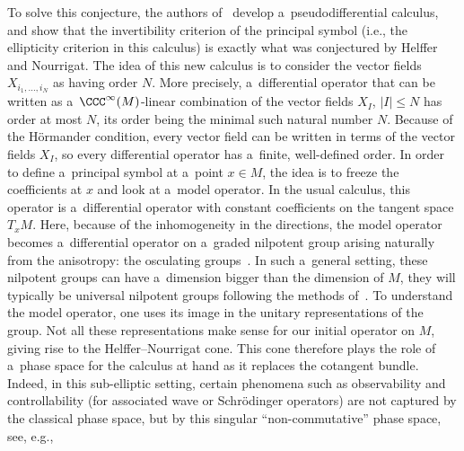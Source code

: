 To solve this conjecture, the authors of~\cite{AMYMaximalHypoellipticity} develop a~pseudodifferential calculus, and show that the invertibility criterion of the principal symbol (i.e., the ellipticity criterion in this calculus) is exactly what was conjectured by Helffer and Nourrigat. The idea of this new calculus is to consider the vector fields $X_{i_1,\dots,i_N}$ as having order $N$. More precisely, a~differential operator that can be written as a~$\CCC^{\infty}(M)$-linear combination of the vector fields $X_{I}$, $|I|\leq N$ has order at most $N$, its order being the minimal such natural number $N$. Because of the H\"ormander condition, every vector field can be written in terms of the vector fields $X_I$, so every differential operator has a~finite, well-defined order. In order to define a~principal symbol at a~point $x\in M$, the idea is to freeze the coefficients at $x$ and look at a~model operator. In the usual calculus, this operator is a~differential operator with constant coefficients on the tangent space $T_xM$. Here, because of the inhomogeneity in the directions, the model operator becomes a~differential operator on a~graded nilpotent group arising naturally from the anisotropy: the osculating groups~\cite{AMYMaximalHypoellipticity,RothschildStein}. In such a~general setting, these nilpotent groups can have a~dimension bigger than the dimension of $M$, they will typically be universal nilpotent groups following the methods of~\cite{RothschildStein}. To understand the model operator, one uses its image in the unitary representations of the group. Not all these representations make sense for our initial operator on $M$, giving rise to the Helffer--Nourrigat cone. This cone therefore plays the role of a~phase space for the calculus at hand as it replaces the cotangent bundle. Indeed, in this sub-elliptic setting, certain phenomena such as observability and controllability (for associated wave or Schr\"odinger operators) are not captured by the classical phase space, but by this singular ``non-commutative'' phase space, see, e.g., \cite{FermanianLetrouit,Letrouit}

